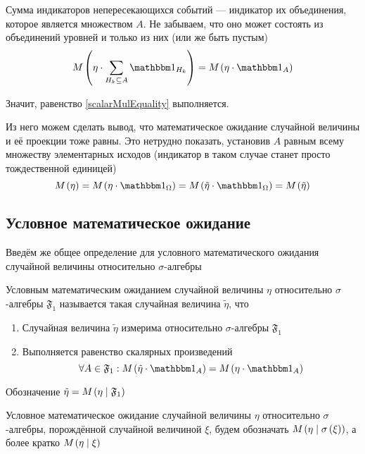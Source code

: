Сумма индикаторов непересекающихся событий --- индикатор их объединения,
которое является множеством $A$.
Не забываем, что оно может состоять из объединений уровней и только из них
(или же быть пустым)
$$\mean{\left( \eta \cdot \sum_{H_k \subseteq A} \indicatorof{H_k} \right)}
    = \mean{\left( \eta \cdot \indicatorof{A} \right)}$$

Значит, равенство \eqref{scalarMulEquality} выполняется.

Из него можем сделать вывод,
что математическое ожидание случайной величины и её проекции тоже равны.
Это нетрудно показать, установив $A$ равным всему множеству элементарных исходов
(индикатор в таком случае станет просто тождественной единицей)
$$\mean{\left( \eta \right)}
    = \mean{\left( \eta \cdot \indicatorof{\Omega} \right)}
    = \mean{\left( \tilde{\eta} \cdot \indicatorof{\Omega} \right)}
    = \mean{\left( \tilde{\eta} \right)}$$

\subsection{Условное математическое ожидание}
Введём же общее определение для условного математического ожидания
случайной величины относительно $\sigma$-алгебры

\begin{definition}
    Условным математическим ожиданием случайной величины $\eta$
    относительно $\sigma$-алгебры $\mathfrak{F}_1$
    называется такая случайная величина $\tilde{\eta}$, что
    \begin{enumerate}
        \item Случайная величина $\tilde{\eta}$
                измерима относительно $\sigma$-алгебры $\mathfrak{F}_1$
        \item Выполняется равенство скалярных произведений
            $$\forall A \in \mathfrak{F}_1:
                \mean{\left( \tilde{\eta} \cdot \indicatorof{A} \right)}
                    = \mean{\left( \eta \cdot \indicatorof{A} \right)}$$
    \end{enumerate}
    Обозначение $\tilde{\eta} = M_{} \left( \eta \mid \mathfrak{F}_1 \right)$

    Условное математическое ожидание случайной величины $\eta$
    относительно $\sigma$-алгебры, порождённой случайной величиной $\xi$,
    будем обозначать $M_{} \left( \eta \mid \sigma\left( \xi \right) \right)$,
    а более кратко $M_{} \left( \eta \mid \xi \right)$
\end{definition}

